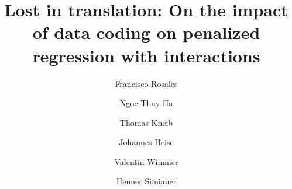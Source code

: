 \documentclass{bmcart}
\newcommand{\0}{\mathbf{0}}
\begin{document}
\begin{frontmatter}

\begin{fmbox}


\title{Lost in translation: On the impact of data coding on penalized regression with interactions}


\author[
   addressref={aff1,aff2},                   %
   noteref={n1},                        %
   email={jmartin2@gwdg.de}   %
]{ }
\author[
addressref={aff6},
noteref={n1}
]{Francisco Rosales}
\author[
addressref={aff3},
noteref={n1},
]{Ngoc-Thuy Ha}
\author[
   addressref={aff4},
]{Thomas Kneib}
\author[
addressref={aff5},
]{Johannes Heise}
\author[
addressref={aff2}
]{Valentin Wimmer}
\author[
addressref={aff1},
]{Henner Simianer}


\address[id=aff1]{%
  , %
}


\end{fmbox}
\end{frontmatter}
\end{document}
